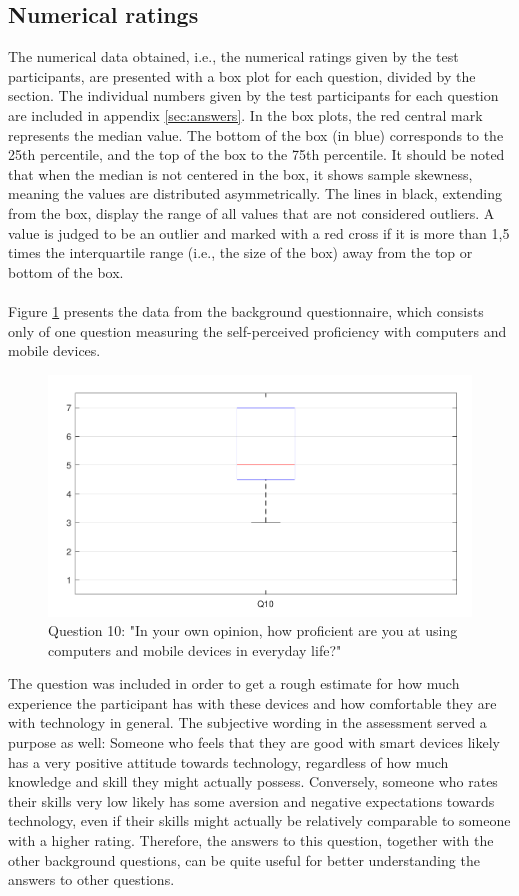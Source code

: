 \documentclass[english, 12pt, a4paper, pdftex, elec, utf8]{aaltothesis}
\begin{document}
\subsection{Numerical ratings} \label{sec:numerical}

The numerical data obtained, i.e., the numerical ratings given by the test participants, are presented with a box plot for each question, divided by the section. The individual numbers given by the test participants for each question are included in appendix \ref{sec:answers}. In the box plots, the red central mark represents the median value. The bottom of the box (in blue) corresponds to the 25th percentile, and the top of the box to the 75th percentile. It should be noted that when the median is not centered in the box, it shows sample skewness, meaning the values are distributed asymmetrically. The lines in black, extending from the box, display the range of all values that are not considered outliers. A value is judged to be an outlier and marked with a red cross if it is more than 1,5 times the interquartile range (i.e., the size of the box) away from the top or bottom of the box. \cite{boxplot} \\\\
Figure \ref{fig:results1} presents the data from the background questionnaire, which consists only of one question measuring the self-perceived proficiency with computers and mobile devices. 
\begin{figure}[t]
	\centering
	\includegraphics[width=\textwidth]{T2_box1.pdf}
	\caption{Question 10: "In your own opinion, how proficient are you at using computers and mobile devices in everyday life?"}
	\label{fig:results1} 
\end{figure}
The question was included in order to get a rough estimate for how much experience the participant has with these devices and how comfortable they are with technology in general. The subjective wording in the assessment served a purpose as well: Someone who feels that they are good with smart devices likely has a very positive attitude towards technology, regardless of how much knowledge and skill they might actually possess. Conversely, someone who rates their skills very low likely has some aversion and negative expectations towards technology, even if their skills might actually be relatively comparable to someone with a higher rating. Therefore, the answers to this question, together with the other background questions, can be quite useful for better understanding the answers to other questions. \\\\
\end{document}
